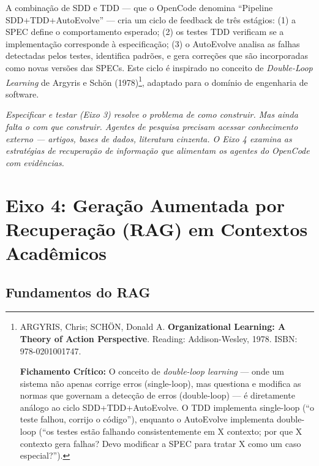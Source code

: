 A combinação de SDD e TDD --- que o OpenCode denomina ``Pipeline SDD+\-TDD+\-Auto\-Evolve'' --- cria um ciclo de feedback de três estágios: (1) a SPEC define o comportamento esperado; (2) os testes TDD verificam se a implementação corresponde à especificação; (3) o AutoEvolve analisa as falhas detectadas pelos testes, identifica padrões, e gera correções que são incorporadas como novas versões das SPECs. Este ciclo é inspirado no conceito de \textit{Double-Loop Learning} de Argyris e Schön (1978)\footnote{
  ARGYRIS, Chris; SCHÖN, Donald A. \textbf{Organizational Learning: A Theory of Action Perspective}. Reading: Addison-Wesley, 1978. ISBN: 978-0201001747.

  \textbf{Fichamento Crítico:} O conceito de \textit{double-loop learning} --- onde um sistema não apenas corrige erros (single-loop), mas questiona e modifica as normas que governam a detecção de erros (double-loop) --- é diretamente análogo ao ciclo SDD+\-TDD+\-Auto\-Evolve. O TDD implementa single-loop (``o teste falhou, corrijo o código''), enquanto o AutoEvolve implementa double-loop (``os testes estão falhando consistentemente em X contexto; por que X contexto gera falhas? Devo modificar a SPEC para tratar X como um caso especial?'').
}, adaptado para o domínio de engenharia de software.

{\small\itshape Especificar e testar (Eixo 3) resolve o problema de \textit{como} construir. Mas ainda falta o \textit{com que} construir. Agentes de pesquisa precisam acessar conhecimento externo — artigos, bases de dados, literatura cinzenta. O Eixo 4 examina as estratégias de recuperação de informação que alimentam os agentes do OpenCode com evidências.}

\section{Eixo 4: Geração Aumentada por Recuperação (RAG) em Contextos Acadêmicos}

\subsection{Fundamentos do RAG}

